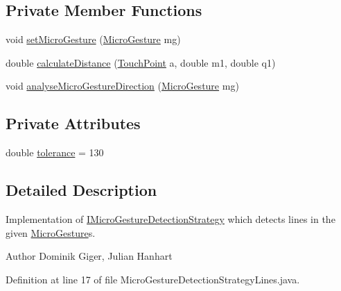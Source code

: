 \subsection*{Private Member Functions}
\begin{DoxyCompactItemize}
\item 
void \hyperlink{classch_1_1zhaw_1_1ba10__bsha__1_1_1strategies_1_1MicroGestureDetectionStrategyLines_ae2fe4b45825de8b32bd93848a6ecac12}{setMicroGesture} (\hyperlink{classch_1_1zhaw_1_1ba10__bsha__1_1_1service_1_1MicroGesture}{MicroGesture} mg)
\item 
double \hyperlink{classch_1_1zhaw_1_1ba10__bsha__1_1_1strategies_1_1MicroGestureDetectionStrategyLines_a752e22e2803dd97ddea5ce9ba6ce9071}{calculateDistance} (\hyperlink{classch_1_1zhaw_1_1ba10__bsha__1_1_1TouchPoint}{TouchPoint} a, double m1, double q1)
\item 
void \hyperlink{classch_1_1zhaw_1_1ba10__bsha__1_1_1strategies_1_1MicroGestureDetectionStrategyLines_ab3ca516ff03d9dc2193d9aaf6afad5e8}{analyseMicroGestureDirection} (\hyperlink{classch_1_1zhaw_1_1ba10__bsha__1_1_1service_1_1MicroGesture}{MicroGesture} mg)
\end{DoxyCompactItemize}
\subsection*{Private Attributes}
\begin{DoxyCompactItemize}
\item 
double \hyperlink{classch_1_1zhaw_1_1ba10__bsha__1_1_1strategies_1_1MicroGestureDetectionStrategyLines_a05159d73fbedc92c3e806f38b1ac4c7d}{tolerance} = 130
\end{DoxyCompactItemize}


\subsection{Detailed Description}
Implementation of \hyperlink{interfacech_1_1zhaw_1_1ba10__bsha__1_1_1strategies_1_1IMicroGestureDetectionStrategy}{IMicroGestureDetectionStrategy} which detects lines in the given \hyperlink{}{MicroGesture}s.

\begin{DoxyAuthor}{Author}
Dominik Giger, Julian Hanhart 
\end{DoxyAuthor}


Definition at line 17 of file MicroGestureDetectionStrategyLines.java.


